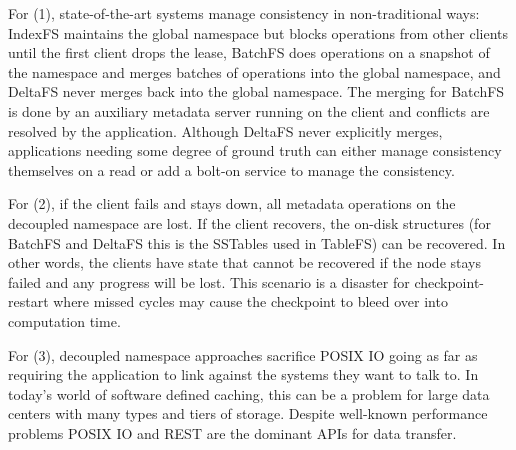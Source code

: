 For (1), state-of-the-art systems manage consistency in non-traditional ways:
IndexFS maintains the global namespace but blocks operations from other clients
until the first client drops the lease, BatchFS does operations on a snapshot
of the namespace and merges batches of operations into the global namespace,
and DeltaFS never merges back into the global namespace. The merging for
BatchFS is done by an auxiliary metadata server running on the client and
conflicts are resolved by the application. Although DeltaFS never explicitly
merges, applications needing some degree of ground truth can either manage
consistency themselves on a read or add a bolt-on service to manage the
consistency.

For (2), if the client fails and stays down, all metadata operations on the
decoupled namespace are lost. If the client recovers, the on-disk structures
(for BatchFS and DeltaFS this is the SSTables used in TableFS) can be
recovered. In other words, the clients have state that cannot be recovered if
the node stays failed and any progress will be lost. This scenario is a
disaster for checkpoint-restart where missed cycles may cause the checkpoint to
bleed over into computation time.

For (3), decoupled namespace approaches sacrifice POSIX IO going as far as
requiring the application to link against the systems they want to talk to. In
today's world of software defined caching, this can be a problem for large data
centers with many types and tiers of storage. Despite well-known performance
problems POSIX IO and REST are the dominant APIs for data transfer.
